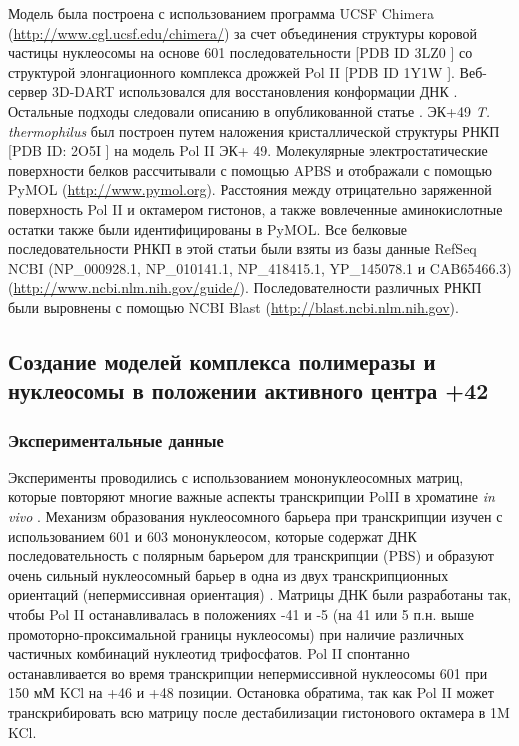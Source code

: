     Модель была построена с использованием программа UCSF Chimera (\url{http://www.cgl.ucsf.edu/chimera/}) \cite{pettersen_ucsf_2004} за счет объединения структуры коровой частицы нуклеосомы на основе 601 последовательности [PDB ID 3LZ0 \cite{vasudevan_crystal_2010}] со структурой элонгационного комплекса дрожжей Pol II [PDB ID 1Y1W \cite{kettenberger_complete_2004}]. Веб-сервер 3D-DART использовался для восстановления конформации ДНК \cite{van_dijk_3d-dart_2009}. Остальные подходы следовали описанию в опубликованной статье \cite{kulaeva_mechanism_2009}. ЭК+49 \textit{T. thermophilus} был построен путем наложения кристаллической структуры РНКП [PDB ID: 2O5I \cite{vassylyev_structural_2007}] на модель Pol II ЭК+ 49. Молекулярные электростатические поверхности белков рассчитывали с помощью APBS \cite{baker_electrostatics_2001} и отображали с помощью PyMOL (\url{http://www.pymol.org}). Расстояния между отрицательно заряженной поверхность Pol II и октамером гистонов, а также вовлеченные аминокислотные остатки также были идентифицированы в PyMOL. Все белковые последовательности РНКП в этой статьи были взяты из базы данные RefSeq NCBI (NP\_000928.1, NP\_010141.1, NP\_418415.1, YP\_145078.1 и CAB65466.3) (\url{http://www.ncbi.nlm.nih.gov/guide/}). Последователности различных РНКП были выровнены с помощью NCBI Blast (\url{http://blast.ncbi.nlm.nih.gov}).
    
    











\subsection{Создание моделей комплекса полимеразы и нуклеосомы в положении активного центра +42}
\subsubsection{Экспериментальные данные}
    Эксперименты проводились с использованием мононуклеосомных матриц, которые повторяют многие важные аспекты транскрипции PolII в хроматине \textit{in vivo} \cite{kulaeva_rna_2010,kireeva_nucleosome_2002,hsieh_histone_2010}. Механизм образования нуклеосомного барьера при транскрипции изучен с использованием 601 и 603 мононуклеосом, которые содержат ДНК последовательность с полярным барьером для транскрипции  (PBS) и образуют очень сильный нуклеосомный барьер в одна из двух транскрипционных ориентаций (непермиссивная ориентация) \cite{bondarenko_nucleosomes_2006,kulaeva_mechanism_2009,gaykalova_polar_2011}. Матрицы ДНК были разработаны так, чтобы Pol II останавливалась в положениях -41 и -5 (на 41 или 5 п.н. выше промоторно-проксимальной границы нуклеосомы) при наличие различных частичных комбинаций нуклеотид трифосфатов. Pol II спонтанно останавливается во время транскрипции непермиссивной нуклеосомы 601 при 150 мМ KCl на +46 и +48 позиции. Остановка обратима, так как Pol II может транскрибировать всю матрицу после дестабилизации гистонового октамера в 1M KCl.
    
